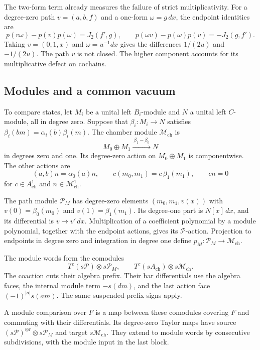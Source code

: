 The two-form term already measures the failure of strict multiplicativity.
For a degree-zero path \(v=(a,b,f)\) and a one-form \(\omega=g\,dx\),
the endpoint identities are
\[
 p(v\omega)-p(v)p(\omega)=J_2(f',g),\qquad
 p(\omega v)-p(\omega)p(v)=-J_2(g,f').
\]
Taking \(v=(0,1,x)\) and \(\omega=u^{-1}dx\) gives the differences
\(1/(2u)\) and \(-1/(2u)\).
The path \(v\) is not closed.
The higher component accounts for its multiplicative defect on cochains.

\subsection{Modules and a common vacuum}
\label{ogd:sec:path-modules}

To\label{ogd:def:path-module-inputs} compare states, let \(M_i\) be a unital left \(B_i\)-module and \(N\)
a unital left \(C\)-module, all in degree zero.
Suppose that \(\beta_i:M_i\to N\) satisfies
\(\beta_i(bm)=\alpha_i(b)\beta_i(m)\).
The chamber module \(\mathcal M_{\mathrm{ch}}\) is
\[
 M_0\oplus M_1\xrightarrow{\ \beta_1-\beta_0\ }N
\]
in degrees zero and one.
Its degree-zero action on \(M_0\oplus M_1\) is componentwise.
The other actions are
\[
 (a,b)n=\alpha_0(a)n,\qquad
 c(m_0,m_1)=c\,\beta_1(m_1),\qquad cn=0
\]
for \(c\in A_{\mathrm{ch}}^1\) and \(n\in\mathcal M_{\mathrm{ch}}^1\).

The\label{ogd:def:module-path-projection} path module \(\mathcal P_M\) has degree-zero elements
\((m_0,m_1,v(x))\) with
\(v(0)=\beta_0(m_0)\) and \(v(1)=\beta_1(m_1)\).
Its degree-one part is \(N[x]\,dx\), and its differential is
\(v\mapsto v'\,dx\).
Multiplication of a coefficient polynomial by a module polynomial,
together with the endpoint actions, gives its \(\mathcal P\)-action.
Projection to endpoints in degree zero and integration in degree one
define \(p_M:\mathcal P_M\to\mathcal M_{\mathrm{ch}}\).

The module words form the comodules
\[
 T^c(s\mathcal P)\otimes s\mathcal P_M,\qquad
 T^c(sA_{\mathrm{ch}})\otimes s\mathcal M_{\mathrm{ch}}.
\]
The coaction cuts their algebra prefix.
Their bar differentials use the algebra faces, the internal module term
\(-s(dm)\), and the last action face \((-1)^{|a|}s(am)\).
The same suspended-prefix signs apply.

A module comparison over \(F\) is a map between these comodules covering
\(F\) and commuting with their differentials.
Its degree-zero Taylor maps have source
\((s\mathcal P)^{\otimes r}\otimes s\mathcal P_M\) and target
\(s\mathcal M_{\mathrm{ch}}\).
They extend to module words by consecutive subdivisions, with the module
input in the last block.

